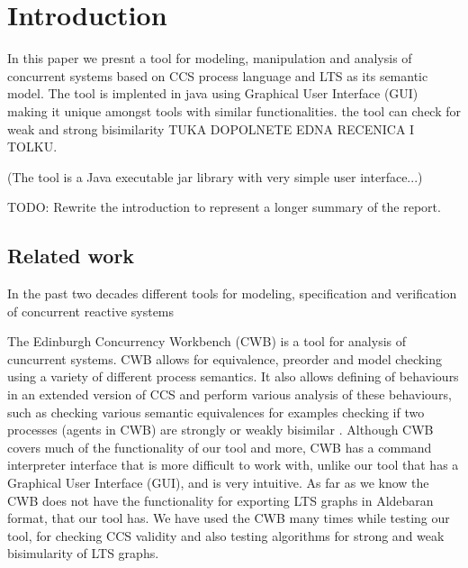 \section{Introduction}

In this paper we presnt a tool for modeling, manipulation and analysis of concurrent systems based on CCS process language and LTS as its semantic model.
The tool is implented in java using Graphical User Interface (GUI) making it unique amongst tools with similar functionalities. the tool can check for weak and strong bisimilarity TUKA DOPOLNETE EDNA RECENICA I TOLKU.



(The tool is a Java executable jar library with very simple user interface...)

TODO: Rewrite the introduction to represent a longer summary of the report. 

\subsection{Related work} 

In the past two decades different tools for modeling, specification and verification of concurrent reactive systems 

The Edinburgh Concurrency Workbench (CWB) is a tool for analysis of cuncurrent systems. CWB allows for equivalence, preorder and model checking using a variety of different process semantics. It also allows defining of behaviours in an extended version of CCS and perform various analysis of these behaviours, such as checking various semantic equivalences for examples checking if two processes (agents in CWB) are strongly or weakly bisimilar \cite{CWB}. Although CWB covers much of the functionality of our tool and more, CWB has a command interpreter interface that is more difficult to work with, unlike our tool that has a Graphical User Interface (GUI), and is very intuitive. As far as we know the CWB does not have the functionality for exporting LTS graphs in Aldebaran format, that our tool has. We have used the CWB many times while testing our tool, for checking CCS validity and also testing algorithms for strong and weak bisimularity of LTS graphs. 

